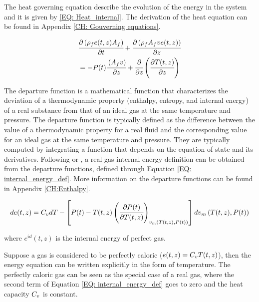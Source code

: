 \documentclass[../Article_Model_Parameters.tex]{subfiles}
\begin{document}
		
			The heat governing equation describe the evolution of the energy in the system and it is given by \ref{EQ: Heat_internal}. The derivation of the heat equation can be found in Appendix \ref{CH: Gouverning equations}.
			
			{\footnotesize
			\begin{align} \label{EQ: Heat_internal}
				&\cfrac{\partial \left( \rho_f e(t,z) A_f \right) }{\partial t} + \cfrac{\partial \left( \rho_f A_f v e(t,z) \right)}{\partial z} \nonumber \\
				&= -{\color{black}P}(t)\cfrac{\left( A_f v \right)}{\partial z} + \cfrac{\partial}{\partial z} \left( \cfrac{\partial T(t,z)}{\partial z} \right) 
			\end{align}
			}
		
			The departure function is a mathematical function that characterizes the deviation of a thermodynamic property (enthalpy, entropy, and internal energy) of a real substance from that of an ideal gas at the same temperature and pressure. The departure function is typically defined as the difference between the value of a thermodynamic property for a real fluid and the corresponding value for an ideal gas at the same temperature and pressure. They are typically computed by integrating a function that depends on the equation of state and its derivatives. Following \citet{Elliott2011} or \citet{Gmehling2019}, a real gas internal energy definition can be obtained from the departure functions, defined through Equation \ref{EQ: internal_energy_def}. More information on the departure functions can be found in Appendix \ref{CH:Enthalpy}.

			{\footnotesize
				\begin{equation}
					de(t,z)=C_vdT-\left[{\color{black}P}(t)-T(t,z)\left(\cfrac{\partial {\color{black}P}(t)}{\partial T(t,z)}\right)_{{\color{black}v_m}\left(T(t,z), {\color{black}P}(t)\right)}\right]d{\color{black}v_m}\left(T(t,z), {\color{black}P}(t)\right)
					\label{EQ: internal_energy_def}
				\end{equation} }
			
			where $e^{id}(t,z)$ is the internal energy of perfect gas.
			
			Suppose a gas is considered to be perfectly caloric ($e(t,z)={\color{black}C_v} T(t,z)$), then the energy equation can be written explicitly in the form of temperature. The perfectly caloric gas can be seen as the special case of a real gas, where the second term of Equation \ref{EQ: internal_energy_def} goes to zero and the heat capacity ${\color{black}C_v}$ is constant.
			
\end{document}
